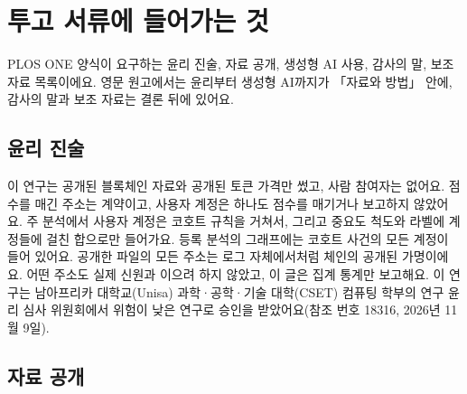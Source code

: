 \section{투고 서류에 들어가는 것}

\begin{yoji}
PLOS ONE 양식이 요구하는 윤리 진술, 자료 공개, 생성형 AI 사용, 감사의 말, 보조 자료 목록이에요. 영문 원고에서는 윤리부터 생성형 AI까지가 「자료와 방법」 안에, 감사의 말과 보조 자료는 결론 뒤에 있어요.
\end{yoji}

\subsection{윤리 진술}

이 연구는 공개된 블록체인 자료와 공개된 토큰 가격만 썼고, 사람 참여자는 없어요. 점수를 매긴 주소는 계약이고, 사용자 계정은 하나도 점수를 매기거나 보고하지 않았어요. 주 분석에서 사용자 계정은 코호트 규칙을 거쳐서, 그리고 중요도 척도와 라벨에 계정들에 걸친 합으로만 들어가요. 등록 분석의 그래프에는 코호트 사건의 모든 계정이 들어 있어요. 공개한 파일의 모든 주소는 로그 자체에서처럼 체인의 공개된 가명이에요. 어떤 주소도 실제 신원과 이으려 하지 않았고, 이 글은 집계 통계만 보고해요. 이 연구는 남아프리카 대학교(Unisa) 과학·공학·기술 대학(CSET) 컴퓨팅 학부의 연구 윤리 심사 위원회에서 위험이 낮은 연구로 승인을 받았어요(참조 번호 18316, 2026년 11월 9일).

\subsection{자료 공개}

